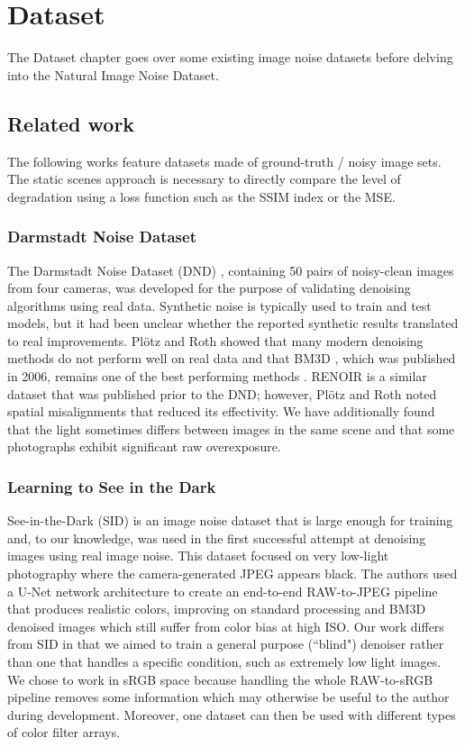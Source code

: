 \chapter{Dataset}

The Dataset chapter goes over some existing image noise datasets before delving into the Natural Image Noise Dataset.

\section{Related work}
The following works feature datasets made of ground-truth / noisy image sets. The static scenes approach is necessary to directly compare the level of degradation using a loss function such as the \ac{SSIM} index or the \ac{MSE}. 
\subsection{Darmstadt Noise Dataset}
The Darmstadt Noise Dataset (DND) \cite{darmstadt}, containing 50 pairs of noisy-clean images from four cameras, was developed for the purpose of validating denoising algorithms using real data. Synthetic noise is typically used to train and test models, but it had been unclear whether the reported synthetic results translated to real improvements. Plötz and Roth showed that many modern denoising methods do not perform well on real data and that BM3D \cite{bm3d}, which was published in 2006, remains one of the best performing methods \cite{darmstadt}. RENOIR \cite{renoir} is a similar dataset that was published prior to the DND; however, Plötz and Roth noted spatial misalignments that reduced its effectivity. We have additionally found that the light sometimes differs between images in the same scene and that some photographs exhibit significant raw overexposure.
\subsection{Learning to See in the Dark}
See-in-the-Dark (SID) \cite{learningtoseeinthedark} is an image noise dataset that is large enough for training and, to our knowledge, was used in the first successful attempt at denoising images using real image noise. This dataset focused on very low-light photography where the camera-generated JPEG appears black. The authors used a U-Net network architecture to create an end-to-end RAW-to-JPEG pipeline that produces realistic colors, improving on standard processing and BM3D denoised images which still suffer from color bias at high ISO. Our work differs from SID in that we aimed to train a general purpose (``blind") denoiser rather than one that handles a specific condition, such as extremely low light images. We chose to work in sRGB space because handling the whole RAW-to-sRGB pipeline removes some information which may otherwise be useful to the author during development. Moreover, one dataset can then be used with different types of color filter arrays.
